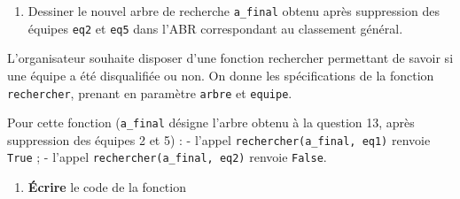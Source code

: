 \begin{enumerate}
\def\labelenumi{\arabic{enumi}.}
\setcounter{enumi}{12}
\tightlist
\item
  Dessiner le nouvel arbre de recherche \texttt{a\_final} obtenu après
  suppression des équipes \texttt{eq2} et \texttt{eq5} dans l'ABR
  correspondant au classement général.
\end{enumerate}

L'organisateur souhaite disposer d'une fonction rechercher permettant de
savoir si une équipe a été disqualifiée ou non. On donne les
spécifications de la fonction \texttt{rechercher}, prenant en paramètre
\texttt{arbre} et \texttt{equipe}.

\begin{Shaded}
\begin{Highlighting}[]
 
   
\end{Highlighting}
\end{Shaded}

Pour cette fonction (\texttt{a\_final} désigne l'arbre obtenu à la
question 13, après suppression des équipes 2 et 5) : - l'appel
\texttt{rechercher(a\_final,\ eq1)} renvoie \texttt{True} ; - l'appel
\texttt{rechercher(a\_final,\ eq2)} renvoie \texttt{False}.

\begin{enumerate}
\def\labelenumi{\arabic{enumi}.}
\setcounter{enumi}{13}
\tightlist
\item
  \textbf{Écrire} le code de la fonction
\end{enumerate}
